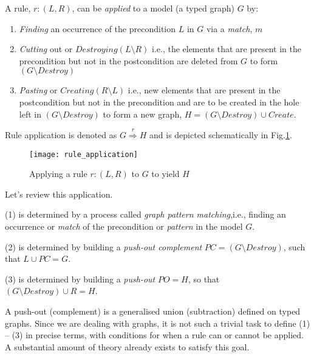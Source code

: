 A rule, $r: (L,R)$, can be \emph{applied} to a model (a typed graph) $G$ by:
\begin{enumerate}
  \item \emph{Finding} an occurrence of the precondition $L$ in $G$ via a \emph{match}, $m$
  
  \item \emph{Cutting} out or $Destroying (L\setminus R)$ i.e., the elements that are present in the precondition but not in the postcondition are deleted
  from $G$ to form  $(G\setminus Destroy)$
  
  \item \emph{Pasting} or $Creating (R\setminus L)$ i.e., new elements that are present in the postcondition but not in the precondition and are to be created
  in the hole left in $(G\setminus Destroy)$ to form a new graph, $H = (G\setminus Destroy) \cup Create$.
\end{enumerate}

Rule application is denoted as $G \stackrel{r}{\Rightarrow} H$ and is depicted schematically in Fig.\ref{fig:rule_application}. 

\vspace{0.5cm}

\begin{figure}[htp]
\begin{center}
  \texttt{[image: rule\_application]}
  \caption[]{Applying a rule $r: (L,R)$ to $G$ to yield $H$} 
  \label{fig:rule_application}
\end{center}
\end{figure}

\vspace{0.5cm}

Let's review this application. 

(1) is determined by a process called \emph{graph pattern matching},i.e., finding an occurrence or \emph{match} of the precondition or
\emph{pattern} in the model $G$.

(2) is determined by building a \emph{push-out complement} $PC = (G\setminus Destroy)$, such that $L\cup PC = G$.

(3) is determined by building a \emph{push-out} $PO = H$, so that $(G\setminus Destroy) \cup R = H$.

A push-out (complement) is a generalised union (subtraction) defined on typed graphs. Since we are dealing with graphs, it is not such a trivial task to define
(1) -- (3) in precise terms, with conditions for when a rule can or cannot be applied. A substantial amount of theory already exists to satisfy this goal.

